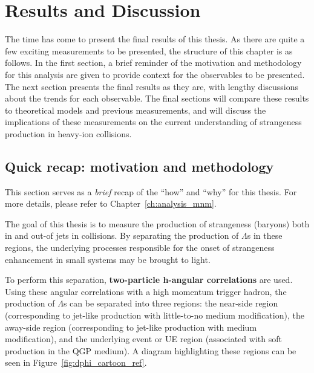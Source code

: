 \chapter{Results and Discussion}
\label{chapter_results}

The time has come to present the final results of this thesis. As there are quite a few exciting measurements to be presented, the structure of this chapter is as follows. In the first section, a brief reminder of the motivation and methodology for this analysis are given to provide context for the observables to be presented. The next section presents the final results as they are, with lengthy discussions about the trends for each observable. The final sections will compare these results to theoretical models and previous measurements, and will discuss the implications of these measurements on the current understanding of strangeness production in heavy-ion collisions.


\section{Quick recap: motivation and methodology}

This section serves as a \textit{brief} recap of the ``how'' and ``why'' for this thesis. For more details, please refer to Chapter~\ref{ch:analysis_mnm}.

The goal of this thesis is to measure the production of strangeness (\lmb baryons) both in and out-of jets in \pPb collisions. By separating the production of $\Lambda$s in these regions, the underlying processes responsible for the onset of strangeness enhancement in small systems may be brought to light.

To perform this separation, \textbf{two-particle h-\lmb angular correlations} are used. Using these angular correlations with a high momentum trigger hadron, the production of $\Lambda$s can be separated into three regions: the near-side region (corresponding to jet-like production with little-to-no medium modification), the away-side region (corresponding to jet-like production with medium modification), and the underlying event or UE region (associated with soft production in the QGP medium). A diagram highlighting these regions can be seen in Figure~\ref{fig:dphi_cartoon_ref}.

